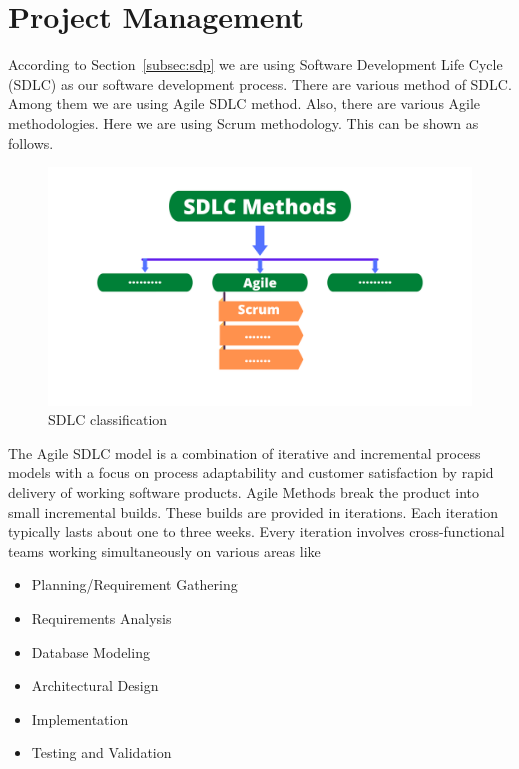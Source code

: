 \section{Project Management}\label{sec:projectmanagement}
According to Section~\ref{subsec:sdp} we are using Software Development Life Cycle (SDLC) as our software development process. There are various method of SDLC. Among them we are using Agile SDLC method. Also, there are various Agile methodologies. Here we are using Scrum methodology. This can be shown as follows.

\begin{figure}[H]
    \centering
    \includegraphics[width=1\textwidth]{images/SDLCMethods}
    \caption{SDLC classification}
    \label{fig:sdlc-class}
\end{figure}

The Agile SDLC model is a combination of iterative and incremental process models with a focus on process adaptability and customer satisfaction by rapid delivery of working software products. Agile Methods break the product into small incremental builds. These builds are provided in iterations. Each iteration typically lasts about one to three weeks.\cite{SDLC_Agile}
Every iteration involves cross-functional teams working simultaneously on various areas like 
\begin{itemize}
\item Planning/Requirement Gathering
\item Requirements Analysis
\item Database Modeling
\item Architectural Design
\item Implementation
\item Testing and Validation
\end{itemize}


